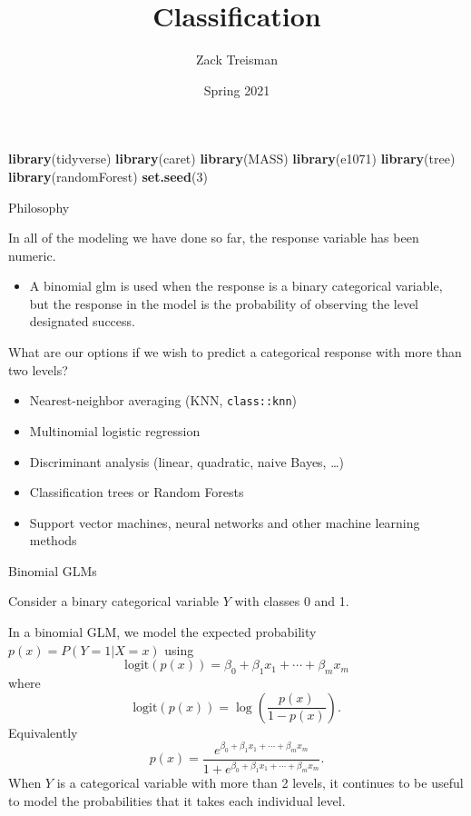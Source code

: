 \documentclass[
  ignorenonframetext,
]{beamer}
\title{Classification}
\author{Zack Treisman}
\date{Spring 2021}
\newenvironment{Shaded}{\begin{snugshade}}{\end{snugshade}}
\newcommand{\DecValTok}[1]{\textcolor[rgb]{0.00,0.00,0.81}{#1}}
\newcommand{\KeywordTok}[1]{\textcolor[rgb]{0.13,0.29,0.53}{\textbf{#1}}}
\newcommand{\NormalTok}[1]{#1}
\providecommand{\tightlist}{%
  \setlength{\itemsep}{0pt}\setlength{\parskip}{0pt}}
\begin{document}
\frame{\titlepage}

\begin{frame}[fragile]

\begin{Shaded}
\begin{Highlighting}[]
\KeywordTok{library}\NormalTok{(tidyverse)}
\KeywordTok{library}\NormalTok{(caret)}
\KeywordTok{library}\NormalTok{(MASS)}
\KeywordTok{library}\NormalTok{(e1071)}
\KeywordTok{library}\NormalTok{(tree)}
\KeywordTok{library}\NormalTok{(randomForest)}
\KeywordTok{set.seed}\NormalTok{(}\DecValTok{3}\NormalTok{)}
\end{Highlighting}
\end{Shaded}

\end{frame}

\begin{frame}[fragile]{Philosophy}
\protect\hypertarget{philosophy}{}

In all of the modeling we have done so far, the response variable has
been numeric.

\begin{itemize}
\tightlist
\item
  A binomial glm is used when the response is a binary categorical
  variable, but the response in the model is the probability of
  observing the level designated success.
\end{itemize}

What are our options if we wish to predict a categorical response with
more than two levels?

\begin{itemize}
\tightlist
\item
  Nearest-neighbor averaging (KNN, \texttt{class::knn})
\item
  Multinomial logistic regression
\item
  Discriminant analysis (linear, quadratic, naive Bayes, \ldots)
\item
  Classification trees or Random Forests
\item
  Support vector machines, neural networks and other machine learning
  methods
\end{itemize}

\end{frame}

\begin{frame}{Binomial GLMs}
\protect\hypertarget{binomial-glms}{}

Consider a binary categorical variable \(Y\) with classes 0 and 1.

In a binomial GLM, we model the expected probability \(p(x)=P(Y=1|X=x)\)
using \[
\text{logit}(p(x))=\beta_0+\beta_1x_1+\cdots+\beta_mx_m
\] where \[
\text{logit}(p(x))=\log\left(\frac{p(x)}{1-p(x)}\right).
\] Equivalently \[
p(x)=\frac{e^{\beta_0+\beta_1x_1+\cdots+\beta_mx_m}}{1+e^{\beta_0+\beta_1x_1+\cdots+\beta_mx_m}}.
\] When \(Y\) is a categorical variable with more than 2 levels, it
continues to be useful to model the probabilities that it takes each
individual level.

\end{frame}
\end{document}

